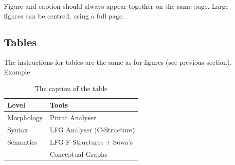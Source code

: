 \documentclass[10pt, a4paper]{article}
\begin{document}
Figure and caption should always appear together on the same page. Large figures can be centred, using a full page.

\subsection{Tables}

The instructions for tables are the same as for figures (see previous section).
Example:
%
\begin{table}[h]
 \begin{center}
\begin{tabular}{|l|l|}

      \hline
      Level&Tools\\
      \hline\hline
      Morphology & Pitrat Analyser\\
      Syntax & LFG Analyser (C-Structure)\\
      Semantics & LFG F-Structures + Sowa's\\
      & Conceptual Graphs\\
      \hline

\end{tabular}
\caption{The caption of the table}
 \end{center}
\end{table}

%
%
%
%
%
\end{document}
